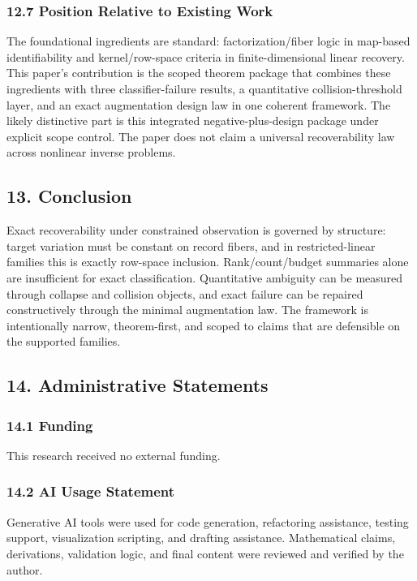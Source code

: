 \documentclass[11pt]{article}
\begin{document}
\subsubsection*{12.7 Position Relative to Existing Work}
The foundational ingredients are standard: factorization/fiber logic in map-based identifiability and kernel/row-space criteria in finite-dimensional linear recovery. This paper's contribution is the scoped theorem package that combines these ingredients with three classifier-failure results, a quantitative collision-threshold layer, and an exact augmentation design law in one coherent framework. The likely distinctive part is this integrated negative-plus-design package under explicit scope control. The paper does not claim a universal recoverability law across nonlinear inverse problems.


\subsection*{13. Conclusion}
Exact recoverability under constrained observation is governed by structure: target variation must be constant on record fibers, and in restricted-linear families this is exactly row-space inclusion. Rank/count/budget summaries alone are insufficient for exact classification. Quantitative ambiguity can be measured through collapse and collision objects, and exact failure can be repaired constructively through the minimal augmentation law. The framework is intentionally narrow, theorem-first, and scoped to claims that are defensible on the supported families.


\subsection*{14. Administrative Statements}
\subsubsection*{14.1 Funding}
This research received no external funding.


\subsubsection*{14.2 AI Usage Statement}
Generative AI tools were used for code generation, refactoring assistance, testing support, visualization scripting, and drafting assistance. Mathematical claims, derivations, validation logic, and final content were reviewed and verified by the author.
\end{document}
